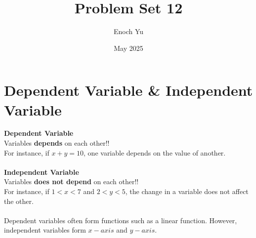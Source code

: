 \documentclass{article}
\title{Problem Set 12}
\author{Enoch Yu}
\date{May 2025}
\begin{document}
\section*{Dependent Variable \& Independent Variable}
\textbf{Dependent Variable} \\
Variables \textbf{depends} on each other!! \\
For instance, if $x+y=10$, one variable depends on the value of another.
\\\\
\textbf{Independent Variable} \\
Variables \textbf{does not depend} on each other!! \\
For instance, if $1<x<7$ and $2<y<5$, the change in a variable does not affect the other.
\\\\
Dependent variables often form functions such as a linear function. However, independent variables form $x-axis$ and $y-axis$.
\end{document}
